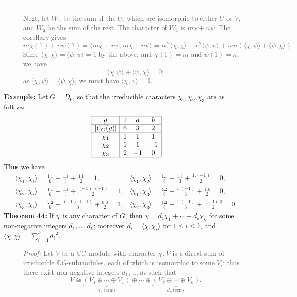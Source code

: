 {\begin{quote}
\\
Next, let $W_1$ be the sum of the $U_i$ which are isomorphic
to either $U$ or $V$, and $W_2$ be the sum of the rest. The
character of $W_1$ is $m\chi+n\psi$. The corollary gives
$$m\chi(1)+n\psi(1)=\langle m\chi+n\psi,m\chi+n\psi\rangle
=m^2\langle\chi,\chi\rangle+n^2\langle\psi,\psi\rangle
+mn(\langle\chi,\psi\rangle+\langle\psi,\chi\rangle).$$
Since $\langle\chi,\chi\rangle=\langle\psi,\psi\rangle=1$ by the above, and
$\chi(1)=m$ and $\psi(1)=n$, we have
$$\langle\chi,\psi\rangle+\langle\psi,\chi\rangle=0;$$
as $\langle\chi,\psi\rangle=\langle\psi,\chi\rangle$,
we must have $\langle\chi,\psi\rangle=0$.
\end{quote}
{\bf Example:} Let $G=D_6$, so that the irreducible characters 
$\chi_1,\chi_2,\chi_3$ are as follows.
$$
\begin{array}{|c|ccc|}
\hline
g&1&a&b\\
\hline
|C_G(g)|&6&3&2\\
\hline
\chi_1&1&1&1\\
\chi_2&1&1&-1\\
\chi_3&2&-1&0\\
\hline
\end{array}
$$
Thus we have
$$
\begin{array}{ll}
\langle\chi_1,\chi_1\rangle=\frac{1.1}{6}+\frac{1.1}{3}+\frac{1.1}{2}=1,
&\langle\chi_1,\chi_2\rangle=\frac{1.1}{6}+\frac{1.1}{3}+\frac{1.(-1)}{2}=0,\\
\langle\chi_2,\chi_2\rangle=\frac{1.1}{6}+\frac{1.1}{3}+\frac{(-1).(-1)}{2}=1,
&\langle\chi_1,\chi_3\rangle=\frac{1.2}{6}+\frac{1.(-1)}{3}+\frac{1.0}{2}=0,\\
\langle\chi_3,\chi_3\rangle=\frac{2.2}{6}+\frac{(-1).(-1)}{3}+\frac{0.0}{2}=1,
&\langle\chi_2,\chi_3\rangle=\frac{1.2}{6}+\frac{1.(-1)}{3}+\frac{(-1).0}{2}=0.
\end{array}
$$
{\bf Theorem 44:} If $\chi$ is any character of $G$, then
$\chi=d_1\chi_1+\cdots+d_k\chi_k$ for some non-negative integers
$d_1,\dots,d_k$; moreover $d_i=\langle\chi,\chi_i\rangle$ for $1\leq i\leq k$,
and $\langle\chi,\chi\rangle=\sum_{i=1}^k{d_i}^2$.
\begin{quote}
\emph{Proof:}
Let $V$ be a ${\mathbb C}G$-module with character $\chi$.
$V$ is a
direct sum of irreducible ${\mathbb C}G$-submodules, each of which is isomorphic to some
$V_i$; thus there exist non-negative integers $d_1,\dots,d_k$ such that
$$V\cong\underbrace{(V_1\oplus\cdots\oplus V_1)}_{d_1\ \mathrm{terms}}\oplus
\cdots\oplus\underbrace{(V_k\oplus\cdots\oplus V_k)}_{d_k\ \mathrm{terms}}.$$

\end{quote}}
